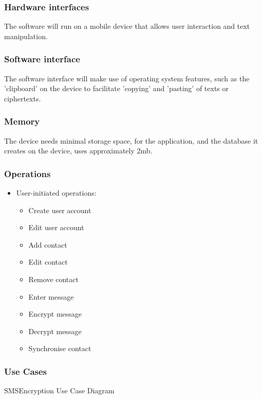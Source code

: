 \subsubsection{Hardware interfaces}
The software will run on a mobile device that allows user interaction and text manipulation.
\subsubsection{Software interface}
The software interface will make use of operating system features, such as the 'clipboard' on the device to facilitate 'copying' and 'pasting' of texts or ciphertexts.
\subsubsection{Memory}
The device needs minimal storage space, for the application, and the database it creates on the device, uses approximately 2mb.
\subsubsection{Operations}
\begin{itemize}
\item User-initiated operations:
\begin{itemize}
\item Create user account
\item Edit user account
\item Add contact
\item Edit contact
\item Remove contact
\item Enter message
\item Encrypt message
\item Decrypt message
\item Synchronise contact
\end{itemize}
\end{itemize}


\subsubsection{Use Cases}
SMSEncryption Use Case Diagram

